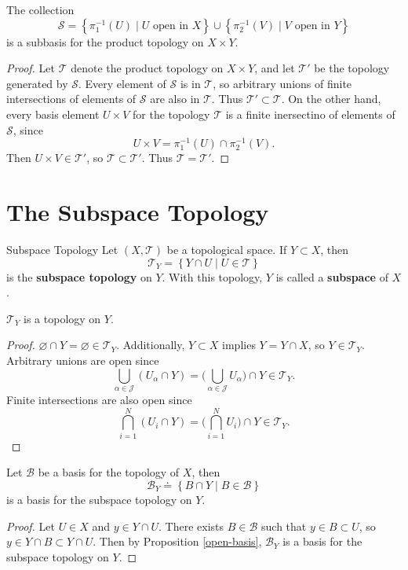 \documentclass[10pt]{report}
\begin{document}
\begin{thrm}{}{}
The collection
\[
	\mathcal{S}=\left\{ \pi_1^{-1}(U) \;|\; U \text{ open in } X \right\} \cup \left\{ \pi_2^{-1}(V) \;|\; V \text{ open in } Y \right\}
\] is a subbasis for the product topology on $X \times Y$.
\end{thrm}
\begin{proof}
	Let $\mathcal{T}$ denote the product topology on $X \times Y$, and let $\mathcal{T}'$ be the topology generated by $\mathcal{S}$. Every element of $\mathcal{S}$ is in $\mathcal{T}$, so arbitrary unions of finite intersections of elements of $\mathcal{S}$ are also in $\mathcal{T}$. Thus $\mathcal{T}' \subset \mathcal{T}$. On the other hand, every basis element $U \times V$ for the topology $\mathcal{T}$ is a finite inersectino of elements of $\mathcal{S}$, since
	\[
		U \times V = \pi_1^{-1}(U) \cap \pi_2^{-1}(V).
	\] Then $U \times V \in \mathcal{T}'$, so $\mathcal{T}\subset \mathcal{T}'$. Thus $\mathcal{T}=\mathcal{T}'$.
\end{proof}


\section{The Subspace Topology}

\begin{defn}{Subspace Topology}{}
	Let $(X,\mathcal{T})$ be a topological space. If $Y \subset X$, then
	\[
	\mathcal{T}_Y = \left\{ Y \cap U \;|\; U \in \mathcal{T} \right\}
	\] is the \textbf{subspace topology} on $Y$. With this topology, $Y$ is called a \textbf{subspace} of $X$.
\end{defn}

\begin{prop}
	$\mathcal{T}_Y$ is a topology on $Y$.
\end{prop}
\begin{proof}
	$\varnothing \cap Y = \varnothing \in \mathcal{T}_Y$. Additionally, $Y \subset X$ implies $Y = Y \cap X$, so $Y \in \mathcal{T}_Y$. Arbitrary unions are open since
	\[
		\bigcup_{\alpha\in\mathcal{J}}(U_\alpha \cap Y) = \bigg( \bigcup_{\alpha\in\mathcal{J}}U_\alpha \bigg) \cap Y \in \mathcal{T}_Y.
	\] 
	Finite intersections are also open since
	\[
		\bigcap_{i=1}^N (U_i \cap Y) = \bigg( \bigcap_{i=1}^N U_i \bigg) \cap Y \in \mathcal{T}_Y.
	\] 
\end{proof}

\begin{prop}
Let $\mathcal{B}$ be a basis for the topology of $X$, then \[\mathcal{B}_Y \doteq \left\{ B \cap Y \;|\; B \in \mathcal{B} \right\}\] is a basis for the subspace topology on $Y$.
\end{prop}
\begin{proof}
	Let $U \in X$ and $y \in Y \cap U$. There exists $B \in \mathcal{B}$ such that $y \in B \subset U$, so $y \in Y \cap B \subset Y \cap U$. Then by Proposition \ref{open-basis}, $\mathcal{B}_Y$ is a basis for the subspace topology on $Y$.
\end{proof}
\end{document}
